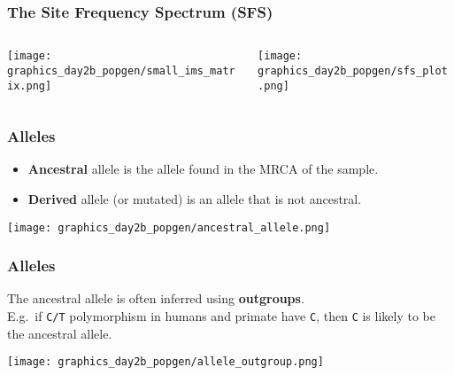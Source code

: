\documentclass{beamer}
\newcommand{\1}{\ensuremath{\mathbf{1}}}
\begin{document}
\begin{frame}\frametitle{The Site Frequency Spectrum (SFS)}
	\begin{columns}
	\begin{column}{0.25\textwidth}
		\begin{center}
			\texttt{[image: graphics\_day2b\_popgen/small\_ims\_matrix.png]}
		\end{center}
	\end{column}
	\begin{column}{0.75\textwidth}
		\begin{center}
			\texttt{[image: graphics\_day2b\_popgen/sfs\_plot.png]}
		\end{center}
	\end{column}
	\end{columns}
\end{frame}
%
%
%
\begin{frame}\frametitle{Alleles}
	\begin{itemize}
		\item \textbf{Ancestral} allele is the allele found in the MRCA of the sample.
		\item \textbf{Derived} allele (or mutated) is an allele that is not ancestral.
	\end{itemize}
	\begin{center}
		\texttt{[image: graphics\_day2b\_popgen/ancestral\_allele.png]}
	\end{center}
\end{frame}
%
%
%
\begin{frame}\frametitle{Alleles}
	The ancestral allele is often inferred using \textbf{outgroups}.\\
	E.g.\ if \texttt{C/T} polymorphism in humans and primate have \texttt{C}, then \texttt{C} is likely to be the ancestral allele.
	\begin{center}
		\texttt{[image: graphics\_day2b\_popgen/allele\_outgroup.png]}
	\end{center}
\end{frame}
%
%
%
\end{document}
